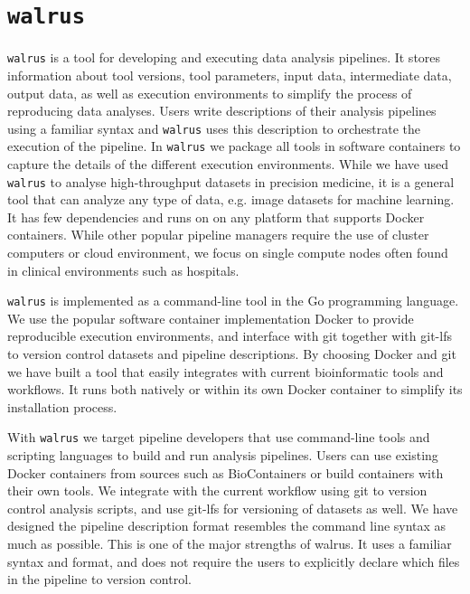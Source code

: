 \section{\texttt{walrus}} 
\texttt{walrus} is a tool for developing and executing data analysis pipelines.
It stores information about tool versions, tool parameters, input data,
intermediate data, output data, as well as execution environments to simplify
the process of reproducing data analyses. Users write descriptions of their
analysis pipelines using a familiar syntax and \texttt{walrus}  uses this
description to orchestrate the execution of the pipeline. In \texttt{walrus}  we
package all tools in software containers to capture the details of the different
execution environments. While we have used \texttt{walrus}  to analyse
high-throughput datasets in precision medicine, it is a general tool that can
analyze any type of data, e.g. image datasets for machine learning. It has few
dependencies and runs on on any platform that supports Docker containers. While
other popular pipeline managers require the use of cluster computers or cloud
environment, we focus on single compute nodes often found in clinical
environments such as hospitals. 

\texttt{walrus} is implemented as a command-line tool in the Go programming
language. We use the popular software container implementation
Docker\cite{docker} to provide reproducible execution environments, and
interface with git together with git-lfs\cite{gitlfs} to version control
datasets and pipeline descriptions. By choosing Docker and git we have built a
tool that easily integrates with current bioinformatic tools and workflows. It
runs both natively or within its own Docker container to simplify its
installation process.

With \texttt{walrus} we target pipeline developers that use command-line tools
and scripting languages to build and run analysis pipelines. Users can use
existing Docker containers from sources such as
BioContainers\cite{biocontainers} or build containers with their own tools.  We
integrate with the current workflow using git to version control analysis
scripts, and use git-lfs for versioning of datasets as well. We have
designed the pipeline description format resembles the command line syntax as
much as possible. This is one of the major strengths of walrus. It uses a
familiar syntax and format, and does not require the users to explicitly
declare which files in the pipeline to version control. 


